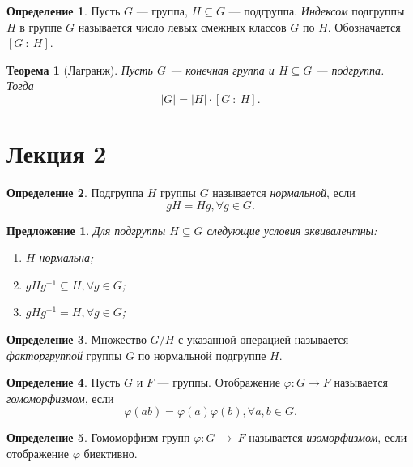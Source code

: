 \documentclass[a4paper]{article}
\theoremstyle{plain}
\newtheorem*{theorem}{Теорема}
\newtheorem{proposal}{Предложение}
\theoremstyle{definition}
\newtheorem{definition}{Определение}
\numberwithin{definition}{section}
\numberwithin{proposal}{section}
\begin{document}
\begin{definition}
Пусть \(G\) --- группа, \(H \subseteq G\) --- подгруппа. \emph{Индексом} подгруппы \(H\) в группе \(G\) называется число левых смежных классов \(G\) по \(H\). Обозначается \([G \::\: H]\).
\end{definition}

\begin{theorem}[Лагранж]
Пусть \(G\) --- конечная группа и \(H \subseteq G\) --- подгруппа. Тогда
\begin{equation*}
	|G| = |H| \cdot [G \::\: H].
\end{equation*}
\end{theorem}


\section{Лекция 2}

\begin{definition}
Подгруппа \(H\) группы \(G\) называется \emph{нормальной}, если
\begin{equation*}
 	gH = Hg, \forall g \in G.
\end{equation*} 
\end{definition}

\begin{proposal}
Для подгруппы \(H \subseteq G\) следующие условия эквивалентны:
\begin{enumerate}
	\item \(H\) нормальна;
	\item \(gHg^{-1} \subseteq H, \forall g \in G\);
	\item \(gHg^{-1} = H, \forall g \in G\);
\end{enumerate}
\end{proposal}

\begin{definition}
Множество \(G / H\) с указанной операцией называется \emph{факторгруппой} группы \(G\) по нормальной подгруппе \(H\).
\end{definition}

\begin{definition}
Пусть \(G\) и \(F\) --- группы. Отображение \(\varphi: G \rightarrow F\) называется \emph{гомоморфизмом}, если
\begin{equation*}
	\varphi(ab) = \varphi(a)\varphi(b), \forall a, b \in G.
\end{equation*}
\end{definition}

\begin{definition}
Гомоморфизм групп \(\varphi: G~\rightarrow~F\) называется \emph{изоморфизмом}, если отображение \(\varphi\) биективно.
\end{definition}
\end{document}
